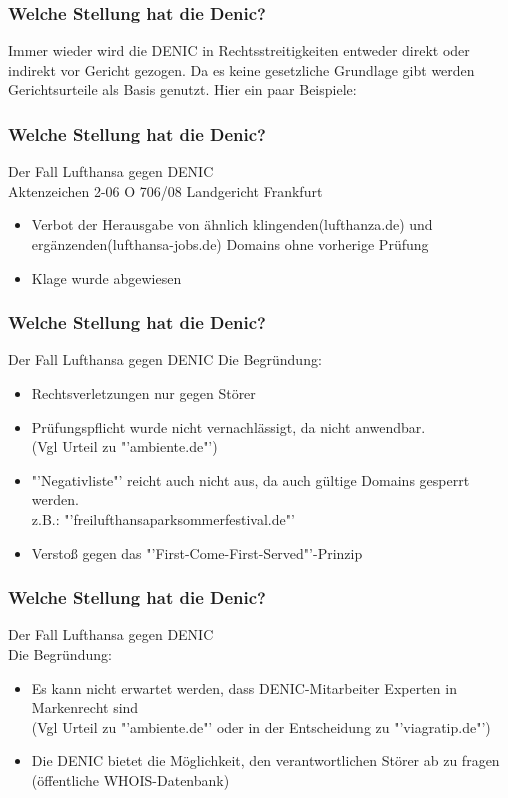 \documentclass{beamer}
\begin{document}
	
	\begin{frame}
		\frametitle{Welche Stellung hat die Denic?}
		Immer wieder wird die DENIC in Rechtsstreitigkeiten entweder direkt oder indirekt vor Gericht gezogen. Da es keine gesetzliche Grundlage gibt werden Gerichtsurteile als Basis genutzt. Hier ein paar Beispiele: 
	\end{frame}
	
	\begin{frame}
		\frametitle{Welche Stellung hat die Denic?}
		Der Fall \glqq Lufthansa gegen DENIC\grqq\\
		\bigskip
		Aktenzeichen 2-06 O 706/08 Landgericht Frankfurt
		\begin{itemize}
			\item Verbot der Herausgabe von ähnlich klingenden(lufthanza.de) und ergänzenden(lufthansa-jobs.de) Domains ohne vorherige Prüfung
			\item Klage wurde abgewiesen
		\end{itemize}
	\end{frame}
	
	
	\begin{frame}
		\frametitle{Welche Stellung hat die Denic?}
		Der Fall \glqq Lufthansa gegen DENIC\grqq
		Die Begründung:
		\begin{itemize}
			\item Rechtsverletzungen nur gegen Störer
			\item Prüfungspflicht wurde nicht vernachlässigt, da nicht anwendbar.\\(Vgl Urteil zu "'ambiente.de"')
			\item "'Negativliste"' reicht auch nicht aus, da auch gültige Domains gesperrt werden.\\ z.B.: "'freilufthansaparksommerfestival.de"'
			\item Verstoß gegen das "'First-Come-First-Served"'-Prinzip
		\end{itemize}
	\end{frame}

	\begin{frame}
		\frametitle{Welche Stellung hat die Denic?}
		Der Fall \glqq Lufthansa gegen DENIC\grqq\\
		Die Begründung:
		\begin{itemize}
			\item Es kann nicht erwartet werden, dass DENIC-Mitarbeiter Experten in Markenrecht sind\\(Vgl Urteil zu "'ambiente.de"' oder in der Entscheidung zu "'viagratip.de"')
			\item Die DENIC bietet die Möglichkeit, den verantwortlichen Störer ab zu fragen (öffentliche WHOIS-Datenbank)
		\end{itemize}
	\end{frame}
	
\end{document}

